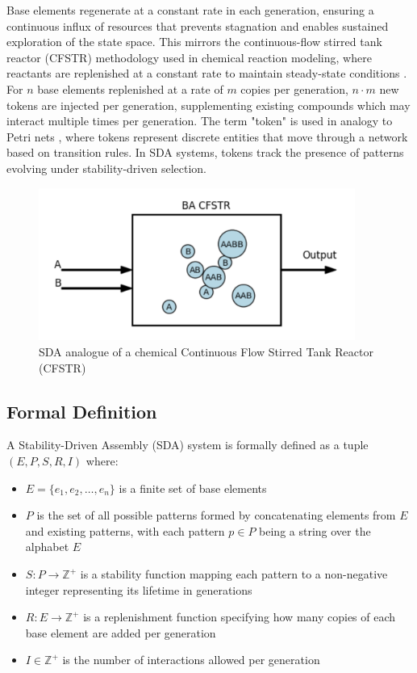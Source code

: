 \documentclass[preprint,12pt]{elsarticle}
\begin{document}
Base elements regenerate at a constant rate in each generation, ensuring a continuous influx of resources that prevents stagnation and enables sustained exploration of the state space. This mirrors the continuous-flow stirred tank reactor (CFSTR) methodology used in chemical reaction modeling, where reactants are replenished at a constant rate to maintain steady-state conditions \cite{fogler1999chemical}. For \( n \) base elements replenished at a rate of \( m \) copies per generation, \( n \cdot m \) new tokens are injected per generation, supplementing existing compounds which may interact multiple times per generation. The term "token" is used in analogy to Petri nets \cite{petri1962communication}, where tokens represent discrete entities that move through a network based on transition rules. In SDA systems, tokens track the presence of patterns evolving under stability-driven selection.

\begin{figure}[htp]
    \centering
    \includegraphics[height=5cm]{figure_1}
    \caption{SDA analogue of a chemical Continuous Flow Stirred Tank Reactor (CFSTR)}
    \label{fig:figure_1}
\end{figure}

\subsection{Formal Definition}

A Stability-Driven Assembly (SDA) system is formally defined as a tuple $(E, P, S, R, I)$ where:
\begin{itemize}
   \item $E = \{e_1, e_2, \ldots, e_n\}$ is a finite set of base elements
   \item $P$ is the set of all possible patterns formed by concatenating elements from $E$ and existing patterns, with each pattern $p \in P$ being a string over the alphabet $E$
   \item $S: P \rightarrow \mathbb{Z}^{+}$ is a stability function mapping each pattern to a non-negative integer representing its lifetime in generations
   \item $R: E \rightarrow \mathbb{Z}^{+}$ is a replenishment function specifying how many copies of each base element are added per generation
   \item $I \in \mathbb{Z}^{+}$ is the number of interactions allowed per generation
\end{itemize}
\end{document}
